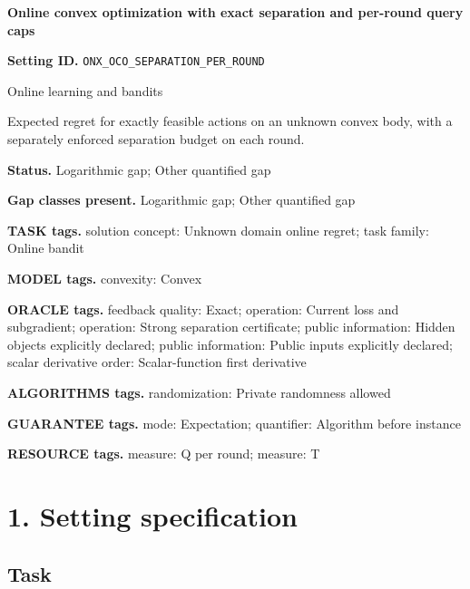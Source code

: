 \documentclass[10pt,a4paper]{article}
\begin{document}
\raggedright

{\LARGE\bfseries\sffamily\color{AtlasNavy} Online convex optimization with exact separation and per-round query caps\par}\vspace{5pt}


\textbf{Setting ID.} \texttt{ONX\_\allowbreak{}OCO\_\allowbreak{}SEPARATION\_\allowbreak{}PER\_\allowbreak{}ROUND}



Online learning and bandits



Expected regret for exactly feasible actions on an unknown convex body, with a separately enforced separation budget on each round.



\textbf{Status.} Logarithmic gap; Other quantified gap



\textbf{Gap classes present.} Logarithmic gap; Other quantified gap



\textbf{TASK tags.} solution concept: Unknown domain online regret; task family: Online bandit



\textbf{MODEL tags.} convexity: Convex



\textbf{ORACLE tags.} feedback quality: Exact; operation: Current loss and subgradient; operation: Strong separation certificate; public information: Hidden objects explicitly declared; public information: Public inputs explicitly declared; scalar derivative order: Scalar-function first derivative



\textbf{ALGORITHMS tags.} randomization: Private randomness allowed



\textbf{GUARANTEE tags.} mode: Expectation; quantifier: Algorithm before instance



\textbf{RESOURCE tags.} measure: Q per round; measure: T



\section{1. Setting specification}


\subsection{Task}
\end{document}

